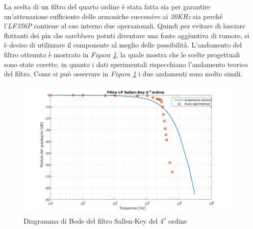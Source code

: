 \documentclass[titlepage]{report}
\begin{document}
	La scelta di un filtro del quarto ordine è stata fatta sia per garantire un'atteuazione sufficiente delle armoniche successive ai \textit{20KHz} sia perché l'\textit{LF356P} contiene al suo interno due operazionali. Quindi per evitare di lasciare flottanti dei pin che sarebbero potuti diventare una fonte aggiuntiva di rumore, si è deciso di utilizzare il componente al meglio delle possibilità.
	L'andamento del filtro ottenuto è mostrato in \textit{Figura \ref{fig:BODELp4Real}}, la quale mostra che le scelte progettuali sono state corette, in quanto i dati sperimentali rispecchiano l'andamento teorico del filtro.
	Come si può osservare in \textit{Figura \ref{fig:BODELp4Real}} i due andamenti sono molto simili.
	
	\begin{figure}[H]
		\centering
		\includegraphics[scale=0.7]{Immagini/bode_lp4.pdf}
		\caption{Diagramma di Bode del filtro Sallen-Key del $4^o$ ordine}
		\label{fig:BODELp4Real}
	\end{figure}
\end{document}
